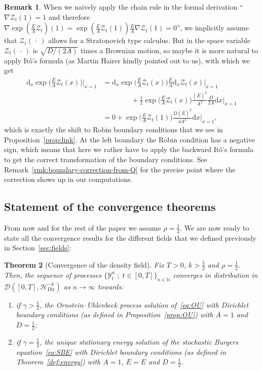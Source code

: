 \documentclass[10pt]{amsart}
\newtheorem{theo}{Theorem}[section]
\theoremstyle{definition}\newtheorem{defi}[theo]{Definition}\newtheorem{rema}[theo]{Remark}\newtheorem{exam}[theo]{Example}\newtheorem{exem}[theo]{Example}\newtheorem{nota}[theo]{Notation}
\newcommand{\bb}[1]{{\mathbb #1}}
\newcommand{\mc}[1]{{\mathcal #1}}
\renewcommand{\mc}[1]{{\mathcal #1}}
\renewcommand{\bar}{\overline}
\newcommand*{\dd}{\mathrm{d}}
\newcommand*{\dx}{\dd x}
\renewcommand{\tfrac}{\frac}
\begin{document}
\begin{rema}\label{rmk:ito-boundary}
When we naively apply the chain rule in the formal derivation ``$\nabla \mc Z_t (1) = 1$ and therefore $\nabla \exp(\tfrac{\bar{E}}{A} \mc Z_t)(1) = \exp(\tfrac{\bar{E}}{A} \mc Z_t(1)) \tfrac{\bar{E}}{A} \nabla \mc Z_t(1) = 0$'', we implicitly assume that $\mc Z_t({\,\cdot\,})$ allows for a Stratonovich type calculus. But in the space variable $\mc Z_t({\,\cdot\,})$ is $\sqrt{D/(2A)}$ times a Brownian motion, so maybe it is more natural to apply It\^o's formula (as Martin Hairer kindly pointed out to us), with which we get
\begin{align*}
\dd_x \exp\bigg(\tfrac{\bar{E}}{A} \mc Z_t(x)\bigg)\bigg|_{x=1} & = \dd_x \exp\bigg(\tfrac{\bar{E}}{A} \mc Z_t(x)\bigg)\frac{\bar{E}}{A} \dd_x \mc Z_t(x)\bigg|_{x=1} \\
&\qquad\qquad + \tfrac{1}{2} \exp\bigg(\tfrac{\bar{E}}{A} \mc Z_t(x)\bigg)\frac{(\bar{E})^2}{A^2} \frac{D}{2A} \dx\bigg|_{x=1}\\
& = 0 + \exp\bigg(\tfrac{\bar{E}}{A} \mc Z_t(1)\bigg)\frac{D(\bar{E})^2}{4A^3}\dx\bigg|_{x=1},
\end{align*}
which is exactly the shift to Robin boundary conditions that we see in Proposition~\ref{prop:link}. At the left boundary the Robin condition has a negative sign, which means that here we rather have to apply the backward It\^o's formula to get the correct transformation of the boundary conditions. See Remark~\ref{rmk:boundary-correction-from-Q} for the precise point where the correction shows up in our computations.
\end{rema}

\subsection{Statement of the convergence theorems} \label{ssec:results}
From now and for the rest of the paper we assume $\rho=\frac12$. We are now ready to state all the convergence results for the different fields that we defined previously in Section~\ref{sec:fields}:


\begin{theo}[Convergence of the density field]\label{theo:convergence}
Fix $T>0$, $k>\frac52$ and $\rho=\frac12$. Then, the sequence of processes $\{\mathcal{Y}_t^n \; ; \; t\in[0,T]\}_{n\in\bb N}$ converges in distribution in $\mc D([0,T],\mc H_{\mathrm{Dir}}^{-k})$ as $n\to \infty$ towards:
\begin{enumerate}
\item \label{3.17.1} if $\gamma>\frac12$, the Ornstein--Uhlenbeck process solution of~\eqref{eq:OU} with Dirichlet boundary conditions (as defined in Proposition~\ref{prop:OU}) with $A=1$ and $D=\frac12$;
\item \label{3.17.2} if $\gamma=\frac12$, the unique stationary energy solution of the stochastic Burgers equation~\eqref{eq:SBE} with Dirichlet boundary conditions (as defined in Theorem~\ref{def:energy}) with $A=1$, $\bar E=E$ and $D=\frac12$.
\end{enumerate}
\end{theo}
\end{document}
